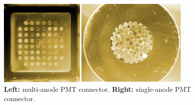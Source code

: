\documentclass[a4paper,11pt]{article}
\begin{document}
\begin{figure}[htp!]
 \centering
 \includegraphics[width=0.85\textwidth]{./pmt_connectors.JPG}
 \caption[PMT connectors]{{\bf Left:} multi-anode PMT connector. {\bf Right:} single-anode PMT connector.}
 \label{fig:pmt_connectors}
\end{figure}
\end{document}
